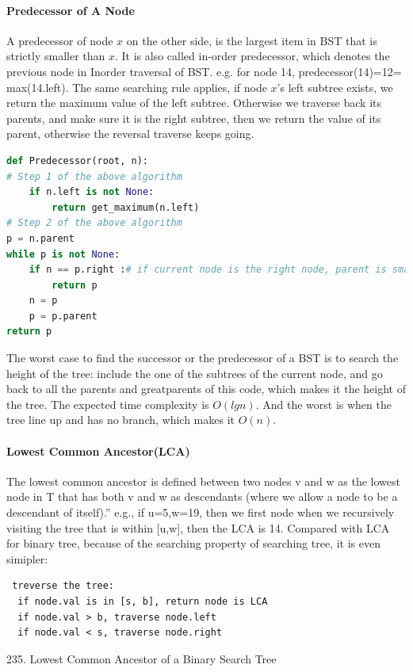 \documentclass[data-structure.tex]{subfiles}
\begin{document}
\paragraph{Predecessor of A Node}  A predecessor of node $x$ on the other side, is the largest item in BST that is strictly smaller than $x$. It is also called in-order predecessor, which denotes the previous node in Inorder traversal of BST. e.g. for node 14, predecessor(14)=12= max(14.left). The same searching rule applies, if node $x$'s left subtree exists, we return the maximum value of the left subtree. Otherwise we traverse back its parents, and make sure it is the right subtree, then we return the value of its parent, otherwise the reversal traverse keeps going. 
\begin{lstlisting}[language = Python]
def Predecessor(root, n):
# Step 1 of the above algorithm
    if n.left is not None:
        return get_maximum(n.left)
# Step 2 of the above algorithm
p = n.parent
while p is not None:
    if n == p.right :# if current node is the right node, parent is smaller
        return p
    n = p
    p = p.parent
return p
\end{lstlisting}
 The worst case to find the successor or the predecessor of a BST is to search the height of the tree: include the one of the subtrees of the current node, and go back to all the parents and greatparents of this code, which makes it the height of the tree. The expected time complexity is $O(lgn)$. And the worst is when the tree line up and has no branch, which makes it $O(n)$. 
 
 \paragraph{Lowest Common Ancestor(LCA)} The lowest common ancestor is defined between two nodes v and w as the lowest node in T that has both v and w as descendants (where we allow a node to be a descendant of itself).” e.g., if u=5,w=19, then we first node when we recursively visiting the tree that is within [u,w], then the LCA is 14. Compared with LCA for binary tree, because of the searching property of searching tree, it is even simipler:
 \begin{lstlisting}
 treverse the tree:
  if node.val is in [s, b], return node is LCA
  if node.val > b, traverse node.left
  if node.val < s, traverse node.right
 \end{lstlisting}
 
 235. Lowest Common Ancestor of a Binary Search Tree
 
\end{document}
